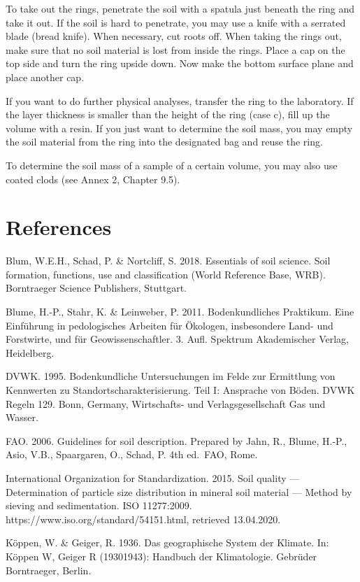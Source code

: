\documentclass[
  letterpaper,
  DIV=11,
  numbers=noendperiod]{scrreprt}
\begin{document}
To take out the rings, penetrate the soil with a spatula just beneath
the ring and take it out. If the soil is hard to penetrate, you may use
a knife with a serrated blade (bread knife). When necessary, cut roots
off. When taking the rings out, make sure that no soil material is lost
from inside the rings. Place a cap on the top side and turn the ring
upside down. Now make the bottom surface plane and place another cap.

If you want to do further physical analyses, transfer the ring to the
laboratory. If the layer thickness is smaller than the height of the
ring (case c), fill up the volume with a resin. If you just want to
determine the soil mass, you may empty the soil material from the ring
into the designated bag and reuse the ring.

To determine the soil mass of a sample of a certain volume, you may also
use coated clods (see Annex 2, Chapter 9.5).

\hypertarget{references-1}{%
\section{References}\label{references-1}}

Blum, W.E.H., Schad, P. \& Nortcliff, S. 2018. Essentials of soil
science. Soil formation, functions, use and classification (World
Reference Base, WRB). Borntraeger Science Publishers, Stuttgart.

Blume, H.-P., Stahr, K. \& Leinweber, P. 2011. Bodenkundliches
Praktikum. Eine Einführung in pedologisches Arbeiten für Ökologen,
insbesondere Land- und Forstwirte, und für Geowissenschaftler. 3. Aufl.
Spektrum Akademischer Verlag, Heidelberg.

DVWK. 1995. Bodenkundliche Untersuchungen im Felde zur Ermittlung von
Kennwerten zu Standortscharakterisierung. Teil I: Ansprache von Böden.
DVWK Regeln 129. Bonn, Germany, Wirtschafts- und Verlagsgesellschaft Gas
und Wasser.

FAO. 2006. Guidelines for soil description. Prepared by Jahn, R., Blume,
H.-P., Asio, V.B., Spaargaren, O., Schad, P. 4th ed.~FAO, Rome.

International Organization for Standardization. 2015. Soil quality ---
Determination of particle size distribution in mineral soil material ---
Method by sieving and sedimentation. ISO 11277:2009.
https://www.iso.org/standard/54151.html, retrieved 13.04.2020.

Köppen, W. \& Geiger, R. 1936. Das geographische System der Klimate. In:
Köppen W, Geiger R (19301943): Handbuch der Klimatologie. Gebrüder
Borntraeger, Berlin.
\end{document}
